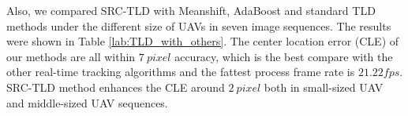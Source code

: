 Also, we compared SRC-TLD with Meanshift, AdaBoost and standard TLD methods under the different size of UAVs in seven image sequences. The results were shown in Table \ref{lab:TLD_with_others}. The center location error (CLE) of our methods are all within $7\ pixel$ accuracy, which is the best compare with the other real-time tracking algorithms and the fattest process frame rate is $21.22 fps$. SRC-TLD method enhances the CLE around $2\ pixel$ both in small-sized UAV and middle-sized UAV sequences.

\begin{table}[ht]
	\centering
	\caption{Target Detection Precision in Image Plane}
	\label{lab:TLD_with_others} 
\end{table}
